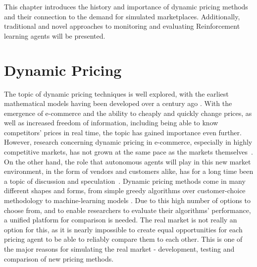 \begin{jointwork}\label{ch:RelatedWork}
	This chapter introduces the history and importance of dynamic pricing methods and their connection to the demand for simulated marketplaces. Additionally, traditional and novel approaches to monitoring and evaluating Reinforcement learning agents will be presented.
\end{jointwork}

\section{Dynamic Pricing}

The topic of dynamic pricing techniques is well explored, with the earliest mathematical models having been developed over a century ago \cite{DynamicPricingHistory}. With the emergence of e-commerce and the ability to cheaply and quickly change prices, as well as increased freedom of information, including being able to know competitors' prices in real time, the topic has gained importance even further. However, research concerning dynamic pricing in e-commerce, especially in highly competitive markets, has not grown at the same pace as the markets themselves~\cite{PricingEcommerceGrowth}. On the other hand, the role that autonomous agents will play in this new market environment, in the form of vendors and customers alike, has for a long time been a topic of discussion and speculation~\cite{PricingBySoftwareAgents}. Dynamic pricing methods come in many different shapes and forms, from simple greedy algorithms over customer-choice methodology to machine-learning models \cite{deGeerPricing}. Due to this high number of options to choose from, and to enable researchers to evaluate their algorithms' performance, a unified platform for comparison is needed. The real market is not really an option for this, as it is nearly impossible to create equal opportunities for each pricing agent to be able to reliably compare them to each other. This is one of the major reasons for simulating the real market - development, testing and comparison of new pricing methods.

